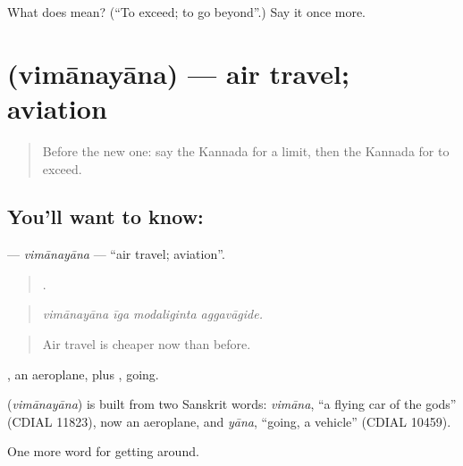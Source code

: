 \begin{tcolorbox}[breakable,colback=teal!4,colframe=teal!35!black,title={Before you move on}]
What does  mean? (\textquotedblleft{}To exceed; to go beyond\textquotedblright{}.) Say it once more.
\end{tcolorbox}
\section[\texorpdfstring{\kn{ವಿಮಾನಯಾನ} (vimānayāna)}{ವಿಮಾನಯಾನ (vimānayāna)}]{ (vimānayāna) — air travel; aviation}

\label{lesson:KA-C438-vimanayana}



\begin{quote}
Before the new one: say the Kannada for a limit, then the Kannada for to exceed.
\end{quote}

\subsection*{You'll want to know: }
\textbf{} — \emph{vimānayāna} — \textquotedblleft{}air travel; aviation\textquotedblright{}.

\begin{quote}
   .
\end{quote}

\begin{quote}
\emph{vimānayāna īga modaliginta aggavāgide.}
\end{quote}

\begin{quote}
Air travel is cheaper now than before.
\end{quote}

, an aeroplane, plus , going.

\begin{cousinweb}
\textbf{} (\emph{vimānayāna}) is built from two Sanskrit words: \emph{vimāna}, \textquotedblleft{}a flying car of the gods\textquotedblright{} (CDIAL 11823), now an aeroplane, and \emph{yāna}, \textquotedblleft{}going, a vehicle\textquotedblright{} (CDIAL 10459).
\end{cousinweb}

\begin{grammarlens}[title={What you've built}]
One more word for getting around.
\end{grammarlens}

